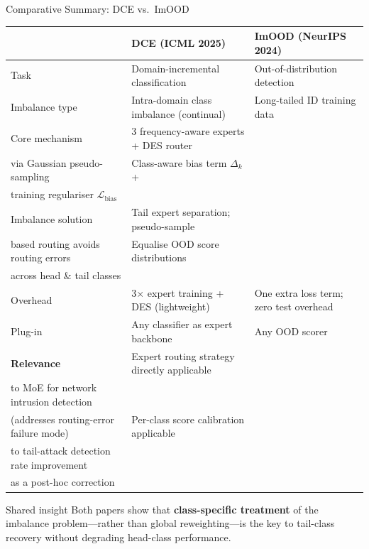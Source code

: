 \documentclass[aspectratio=169,10pt]{beamer}
\begin{document}
\begin{frame}{Comparative Summary: DCE vs.\ ImOOD}
  \footnotesize
  \renewcommand{\arraystretch}{1.4}
  \begin{tabular}{lp{5.2cm}p{5.2cm}}
    \toprule
    & \textbf{DCE} (ICML 2025) & \textbf{ImOOD} (NeurIPS 2024) \\
    \midrule
    Task
      & Domain-incremental classification
      & Out-of-distribution detection \\
    Imbalance type
      & Intra-domain class imbalance (continual)
      & Long-tailed ID training data \\
    Core mechanism
      & 3 frequency-aware experts + DES router\\
        via Gaussian pseudo-sampling
      & Class-aware bias term $\Delta_k$ +\\
        training regulariser $\mathcal{L}_{\text{bias}}$ \\
    Imbalance solution
      & Tail expert separation; pseudo-sample\\
        based routing avoids routing errors
      & Equalise OOD score distributions\\
        across head \& tail classes \\
    Overhead
      & 3$\times$ expert training + DES (lightweight)
      & One extra loss term; zero test overhead \\
    Plug-in
      & Any classifier as expert backbone
      & Any OOD scorer \\
    \midrule
    \textbf{Relevance}
      & Expert routing strategy directly applicable\\
        to MoE for network intrusion detection\\
        (addresses routing-error failure mode)
      & Per-class score calibration applicable\\
        to tail-attack detection rate improvement\\
        as a post-hoc correction \\
    \bottomrule
  \end{tabular}
  \vspace{6pt}
  \begin{block}{Shared insight}
    Both papers show that \textbf{class-specific treatment} of the imbalance
    problem---rather than global reweighting---is the key to tail-class recovery
    without degrading head-class performance.
  \end{block}
\end{frame}
\end{document}
